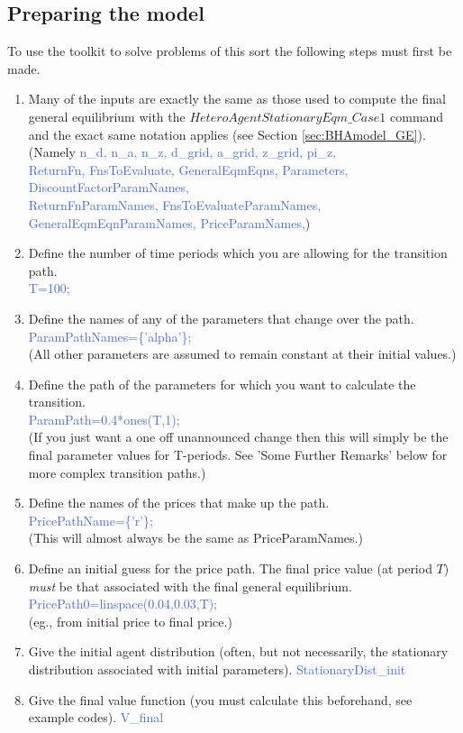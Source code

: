 \subsection{Preparing the model}
To use the toolkit to solve problems of this sort the following steps must first be made.
\begin{enumerate}
 \item Many of the inputs are exactly the same as those used to compute the final general equilibrium with the $HeteroAgentStationaryEqm\_{}Case1$ command
   and the exact same notation applies (see Section \ref{sec:BHAmodel_GE}). \\
    (Namely \textcolor{RoyalBlue}{n\_{}d, n\_{}a, n\_{}z, d\_{}grid, a\_{}grid, z\_{}grid, pi\_{}z,} \\
    \indent \textcolor{RoyalBlue}{ReturnFn, FnsToEvaluate, GeneralEqmEqns, Parameters, DiscountFactorParamNames,} \\
    \indent \textcolor{RoyalBlue}{ReturnFnParamNames, FnsToEvaluateParamNames, GeneralEqmEqnParamNames, PriceParamNames,})
 \item Define the number of time periods which you are allowing for the transition path. \\
    \textcolor{RoyalBlue}{T=100;}
 \item Define the names of any of the parameters that change over the path. \\
   \textcolor{RoyalBlue}{ParamPathNames=\{'alpha'\};} \\
   (All other parameters are assumed to remain constant at their initial values.)
 \item Define the path of the parameters for which you want to calculate the transition. \\
    \textcolor{RoyalBlue}{ParamPath=0.4*ones(T,1);} \\
    (If you just want a one off unannounced change then this will simply be the final parameter values for T-periods. See 'Some Further Remarks' below for more complex transition paths.)
  \item Define the names of the prices that make up the path. \\
   \textcolor{RoyalBlue}{PricePathName=\{'r'\};} \\
   (This will almost always be the same as PriceParamNames.)
  \item Define an initial guess for the price path. The final price value (at period $T$) \textit{must} be that associated with the final general equilibrium.  \\
   \textcolor{RoyalBlue}{PricePath0=linspace(0.04,0.03,T);} \\
   (eg., from initial price to final price.)
  \item Give the initial agent distribution (often, but not necessarily, the stationary distribution associated with initial parameters).
   \textcolor{RoyalBlue}{StationaryDist\_{}init}
  \item Give the final value function (you must calculate this beforehand, see example codes).
   \textcolor{RoyalBlue}{V\_{}final}
\end{enumerate}
